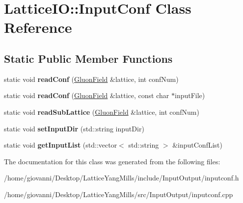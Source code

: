 \hypertarget{classLatticeIO_1_1InputConf}{}\section{Lattice\+IO\+:\+:Input\+Conf Class Reference}
\label{classLatticeIO_1_1InputConf}
\subsection*{Static Public Member Functions}
\begin{DoxyCompactItemize}
\item 
static void {\bfseries read\+Conf} (\hyperlink{classField}{Gluon\+Field} \&lattice, int conf\+Num)\hypertarget{classLatticeIO_1_1InputConf_a70d70bfdc0252ddaa3d2bcd472590982}{}\label{classLatticeIO_1_1InputConf_a70d70bfdc0252ddaa3d2bcd472590982}

\item 
static void {\bfseries read\+Conf} (\hyperlink{classField}{Gluon\+Field} \&lattice, const char $\ast$input\+File)\hypertarget{classLatticeIO_1_1InputConf_aed71fc3df1e2a9999e4466b5eefdf723}{}\label{classLatticeIO_1_1InputConf_aed71fc3df1e2a9999e4466b5eefdf723}

\item 
static void {\bfseries read\+Sub\+Lattice} (\hyperlink{classField}{Gluon\+Field} \&lattice, int conf\+Num)\hypertarget{classLatticeIO_1_1InputConf_a0ea75c17916f8ce880d02a13b127cea8}{}\label{classLatticeIO_1_1InputConf_a0ea75c17916f8ce880d02a13b127cea8}

\item 
static void {\bfseries set\+Input\+Dir} (std\+::string input\+Dir)\hypertarget{classLatticeIO_1_1InputConf_a49a84ce29fc32889d6c356c3afd09b71}{}\label{classLatticeIO_1_1InputConf_a49a84ce29fc32889d6c356c3afd09b71}

\item 
static void {\bfseries get\+Input\+List} (std\+::vector$<$ std\+::string $>$ \&input\+Conf\+List)\hypertarget{classLatticeIO_1_1InputConf_a16b06fe98129e3c1e80879fa9cad43a9}{}\label{classLatticeIO_1_1InputConf_a16b06fe98129e3c1e80879fa9cad43a9}

\end{DoxyCompactItemize}


The documentation for this class was generated from the following files\+:\begin{DoxyCompactItemize}
\item 
/home/giovanni/\+Desktop/\+Lattice\+Yang\+Mills/include/\+Input\+Output/inputconf.\+h\item 
/home/giovanni/\+Desktop/\+Lattice\+Yang\+Mills/src/\+Input\+Output/inputconf.\+cpp\end{DoxyCompactItemize}
